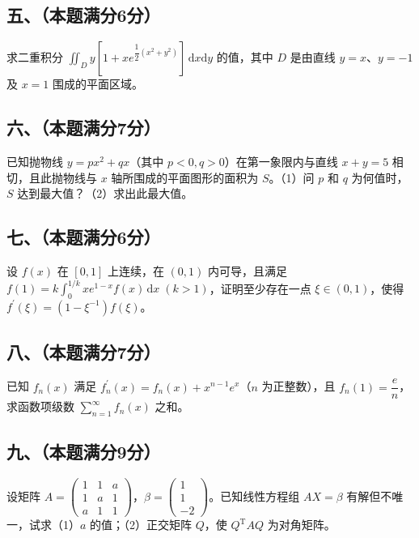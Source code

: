 \documentclass[UTF8,12pt]{ctexart}
\begin{document}
\subsection*{五、（本题满分6分）}

求二重积分 \(\displaystyle \iint_D y[1+xe^{\dfrac{\displaystyle 1}{\displaystyle 2}(x^2+y^2)}]\,\mathrm dx\mathrm dy\) 的值，其中 \(\displaystyle D\) 是由直线 \(\displaystyle y=x\)、\(\displaystyle y=-1\) 及 \(\displaystyle x=1\) 围成的平面区域。


\subsection*{六、（本题满分7分）}

已知抛物线 \(\displaystyle y=px^2+qx\)（其中 \(\displaystyle p<0,\allowbreak q>0\)）在第一象限内与直线 \(\displaystyle x+y=5\) 相切，且此抛物线与 \(\displaystyle x\) 轴所围成的平面图形的面积为 \(\displaystyle S\)。（1）问 \(\displaystyle p\) 和 \(\displaystyle q\) 为何值时，\(\displaystyle S\) 达到最大值？（2）求出此最大值。


\subsection*{七、（本题满分6分）}

设 \(\displaystyle f(x)\) 在 \(\displaystyle [0,\allowbreak 1]\) 上连续，在 \(\displaystyle (0,\allowbreak 1)\) 内可导，且满足 \(\displaystyle f(1)=k\displaystyle \int_0^{1/k}xe^{1-x}f(x)\,\mathrm dx\;(k>1)\)，证明至少存在一点 \(\displaystyle \xi\in(0,\allowbreak 1)\)，使得 \(\displaystyle f^{\prime}(\xi)=(1-\xi^{-1})f(\xi)\)。


\subsection*{八、（本题满分7分）}

已知 \(\displaystyle f_n(x)\) 满足 \(\displaystyle f_n^{\prime}(x)=f_n(x)+x^{n-1}e^x\)（\(\displaystyle n\) 为正整数），且 \(\displaystyle f_n(1)=\dfrac{\displaystyle e}{\displaystyle n}\)，求函数项级数 \(\displaystyle \sum_{n=1}^{\infty}f_n(x)\) 之和。


\subsection*{九、（本题满分9分）}

设矩阵 \(\displaystyle A=\begin{pmatrix}1&1&a\\1&a&1\\a&1&1\end{pmatrix}\)，\(\displaystyle \beta=\begin{pmatrix}1\\1\\-2\end{pmatrix}\)。已知线性方程组 \(\displaystyle AX=\beta\) 有解但不唯一，试求（1）\(\displaystyle a\) 的值；（2）正交矩阵 \(\displaystyle Q\)，使 \(\displaystyle Q^{\mathrm T}AQ\) 为对角矩阵。
\end{document}
